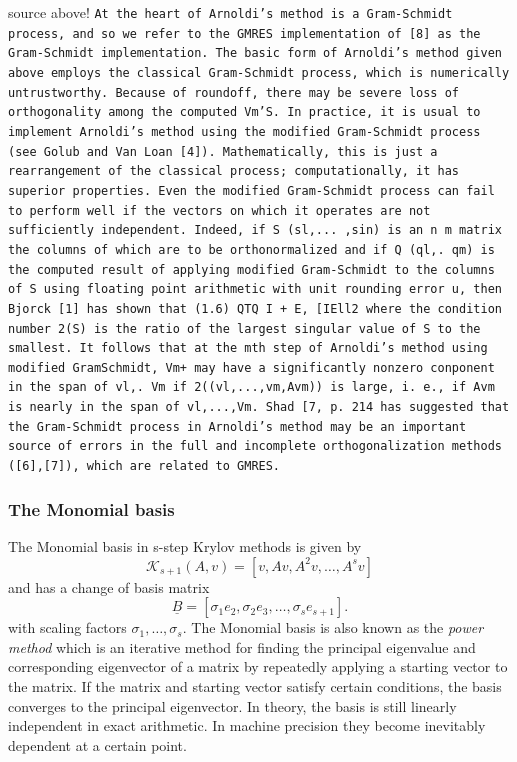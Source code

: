 \documentclass{scrartcl}
\begin{document}
source above! \texttt{At the heart of Arnoldi’s method is a Gram-Schmidt process, and so we refer to the
GMRES implementation of [8] as the Gram-Schmidt implementation. The basic form
of Arnoldi’s method given above employs the classical Gram-Schmidt process, which
is numerically untrustworthy. Because of roundoff, there may be severe loss of orthogonality among the computed Vm’S. In practice, it is usual to implement Arnoldi’s
method using the modified Gram-Schmidt process (see Golub and Van Loan [4]).
Mathematically, this is just a rearrangement of the classical process; computationally, it has superior properties.
Even the modified Gram-Schmidt process can fail to perform well if the vectors on which it operates are not sufficiently independent. Indeed, if S (sl,... ,sin) is an n m matrix the columns of which are to be orthonormalized and if Q (ql,. qm) is the computed result of applying modified Gram-Schmidt to the columns of S using floating point arithmetic with unit rounding error u, then Bjorck [1] has shown that (1.6) QTQ I + E, [IEll2 where the condition number 2(S) is the ratio of the largest singular value of S to the smallest. It follows that at the mth step of Arnoldi’s method using modified GramSchmidt, Vm+ may have a significantly nonzero conponent in the span of {vl,. Vm}
if 2((vl,...,vm,Avm)) is large, i. e., if Avm is nearly in the span of {vl,...,Vm}.
Shad [7, p. 214 has suggested that the Gram-Schmidt process in Arnoldi’s method may be an important source of errors in the full and incomplete orthogonalization
methods ([6],[7]), which are related to GMRES.
}

\subsubsection{The Monomial basis}
The Monomial basis in s-step Krylov methods is given by 
\begin{equation*}
\mathcal{K}_{s + 1}(A, v) = [v, Av, A^2v, \ldots, A^sv]
\end{equation*}
and has a change of basis matrix
\begin{equation*}
\underline{B} = [\sigma_1 e_2, \sigma_2 e_3, \ldots, \sigma_s e_{s + 1}].
\end{equation*}
with scaling factors $\sigma_1, \ldots, \sigma_s$.
The Monomial basis is also known as the \textit{power method} which is an iterative method for finding the principal eigenvalue and corresponding eigenvector of a matrix by repeatedly applying a starting vector to the matrix. If the matrix and starting vector satisfy certain conditions, the basis converges to the principal eigenvector. In theory, the basis is still linearly independent in exact arithmetic. In machine precision they become inevitably dependent at a certain point. \\
\end{document}
